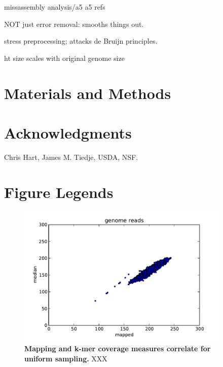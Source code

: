 \documentclass[10pt]{article}
\begin{document}
missassembly analysis/a5
a5 refs

NOT just error removal: smooths things out.

stress preprocessing; attacks de Bruijn principles.

ht size scales with original genome size


\section*{Materials and Methods}

\section*{Acknowledgments}

Chris Hart, James M. Tiedje, USDA, NSF.



\section*{Figure Legends}
\begin{figure}[!ht]
\begin{center}
\includegraphics[width=4in]{diginorm-fig1a.pdf}
\end{center}
\caption{
{\bf Mapping and k-mer coverage measures correlate for uniform sampling.}
XXX
}
\label{fig:random}
\end{figure}
\end{document}
